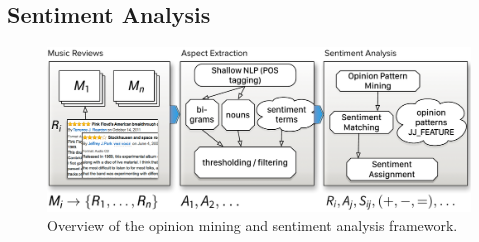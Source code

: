 


\subsection{Sentiment Analysis}\label{sec:musicology:sentiment}

\begin{figure}
\includegraphics[width=\columnwidth]{ch05_musicology/pics/omf}
\caption{Overview of the opinion mining and sentiment analysis framework.}
\label{fig:musicology:OMF}
\end{figure}

